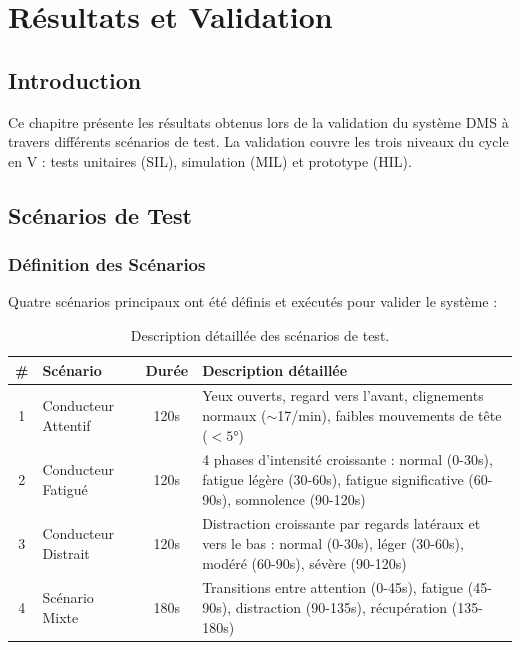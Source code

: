 
\chapter{Résultats et Validation}

\section{Introduction}

Ce chapitre présente les résultats obtenus lors de la validation du système DMS à travers différents scénarios de test. La validation couvre les trois niveaux du cycle en V : tests unitaires (SIL), simulation (MIL) et prototype (HIL).

\section{Scénarios de Test}

\subsection{Définition des Scénarios}

Quatre scénarios principaux ont été définis et exécutés pour valider le système :

\begin{table}[H]
\centering
\caption{Description détaillée des scénarios de test.}
\label{tab:scenarios}
\renewcommand{\arraystretch}{1.4}
\begin{tabularx}{\textwidth}{|c|l|c|X|}
\hline
\rowcolor{stellantisblue!15}
\textbf{\#} & \textbf{Scénario} & \textbf{Durée} & \textbf{Description détaillée} \\
\hline
1 & Conducteur Attentif & 120s & Yeux ouverts, regard vers l'avant, clignements normaux ($\sim$17/min), faibles mouvements de tête ($<5°$) \\
\hline
2 & Conducteur Fatigué & 120s & 4 phases d'intensité croissante : normal (0-30s), fatigue légère (30-60s), fatigue significative (60-90s), somnolence (90-120s) \\
\hline
3 & Conducteur Distrait & 120s & Distraction croissante par regards latéraux et vers le bas : normal (0-30s), léger (30-60s), modéré (60-90s), sévère (90-120s) \\
\hline
4 & Scénario Mixte & 180s & Transitions entre attention (0-45s), fatigue (45-90s), distraction (90-135s), récupération (135-180s) \\
\hline
\end{tabularx}
\end{table}

